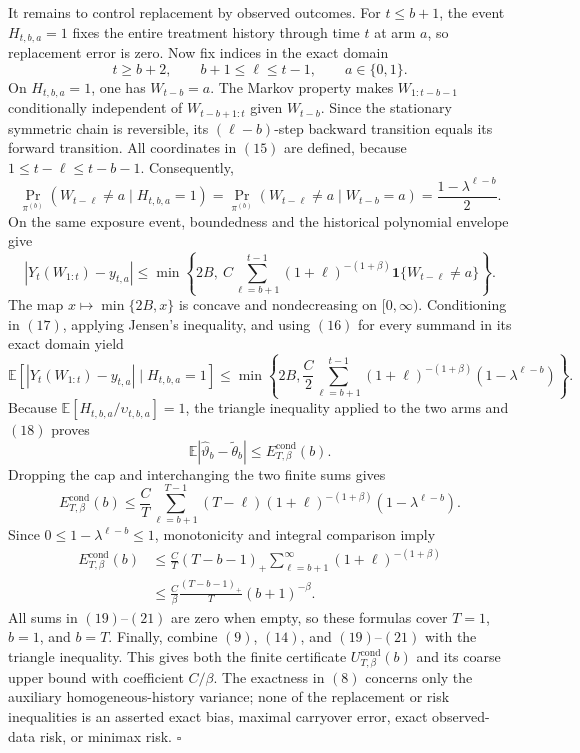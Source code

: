 It remains to control replacement by observed outcomes. For \(t\le b+1\), the event \(H_{t,b,a}=1\) fixes the entire treatment history through time \(t\) at arm \(a\), so replacement error is zero. Now fix indices in the exact domain
\[
t\ge b+2,\qquad b+1\le\ell\le t-1,\qquad a\in\{0,1\}.
\tag{15}
\]
On \(H_{t,b,a}=1\), one has \(W_{t-b}=a\). The Markov property makes \(W_{1:t-b-1}\) conditionally independent of \(W_{t-b+1:t}\) given \(W_{t-b}\). Since the stationary symmetric chain is reversible, its \((\ell-b)\)-step backward transition equals its forward transition. All coordinates in \((15)\) are defined, because \(1\le t-\ell\le t-b-1\). Consequently,
\[
\Pr_{\pi^{(b)}}(W_{t-\ell}\ne a\mid H_{t,b,a}=1)
=\Pr_{\pi^{(b)}}(W_{t-\ell}\ne a\mid W_{t-b}=a)
=\frac{1-\lambda^{\ell-b}}2.
\tag{16}
\]
On the same exposure event, boundedness and the historical polynomial envelope give
\[
|Y_t(W_{1:t})-y_{t,a}|
\le \min\!\left\{2B,\ C\sum_{\ell=b+1}^{t-1}(1+\ell)^{-(1+\beta)}\mathbf1\{W_{t-\ell}\ne a\}\right\}.
\tag{17}
\]
The map \(x\mapsto\min\{2B,x\}\) is concave and nondecreasing on \([0,\infty)\). Conditioning in \((17)\), applying Jensen's inequality, and using \((16)\) for every summand in its exact domain yield
\[
\mathbb E\!\left[|Y_t(W_{1:t})-y_{t,a}|\mid H_{t,b,a}=1\right]
\le\min\!\left\{2B,\frac C2\sum_{\ell=b+1}^{t-1}(1+\ell)^{-(1+\beta)}(1-\lambda^{\ell-b})\right\}.
\tag{18}
\]
Because \(\mathbb E[H_{t,b,a}/\upsilon_{t,b,a}]=1\), the triangle inequality applied to the two arms and \((18)\) proves
\[
\mathbb E|\widehat\vartheta_b-\widetilde\theta_b|\le E_{T,\beta}^{\mathrm{cond}}(b).
\tag{19}
\]
Dropping the cap and interchanging the two finite sums gives
\[
E_{T,\beta}^{\mathrm{cond}}(b)
\le\frac CT\sum_{\ell=b+1}^{T-1}(T-\ell)(1+\ell)^{-(1+\beta)}(1-\lambda^{\ell-b}).
\tag{20}
\]
Since \(0\le1-\lambda^{\ell-b}\le1\), monotonicity and integral comparison imply
\[
\begin{aligned}
E_{T,\beta}^{\mathrm{cond}}(b)
&\le\frac CT(T-b-1)_+\sum_{\ell=b+1}^{\infty}(1+\ell)^{-(1+\beta)}\\
&\le\frac C\beta\frac{(T-b-1)_+}{T}(b+1)^{-\beta}.
\end{aligned}
\tag{21}
\]
All sums in \((19)\)--\((21)\) are zero when empty, so these formulas cover \(T=1\), \(b=1\), and \(b=T\). Finally, combine \((9)\), \((14)\), and \((19)\)--\((21)\) with the triangle inequality. This gives both the finite certificate \(U_{T,\beta}^{\mathrm{cond}}(b)\) and its coarse upper bound with coefficient \(C/\beta\). The exactness in \((8)\) concerns only the auxiliary homogeneous-history variance; none of the replacement or risk inequalities is an asserted exact bias, maximal carryover error, exact observed-data risk, or minimax risk. \(\square\)